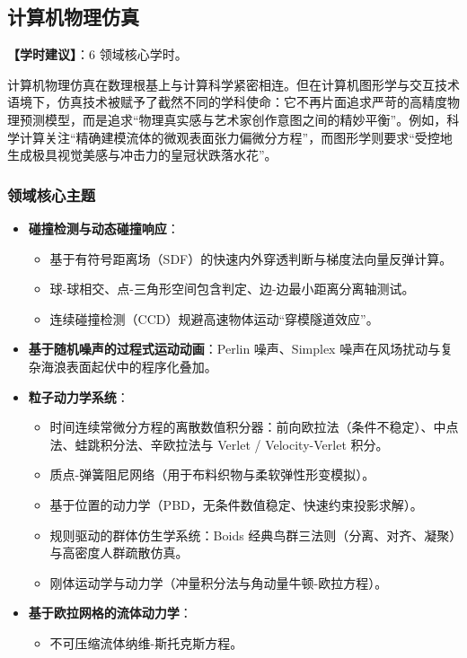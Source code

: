 \subsection{计算机物理仿真}
\textbf{【学时建议】}：6 领域核心学时。

计算机物理仿真在数理根基上与计算科学紧密相连。但在计算机图形学与交互技术语境下，仿真技术被赋予了截然不同的学科使命：它不再片面追求严苛的高精度物理预测模型，而是追求“物理真实感与艺术家创作意图之间的精妙平衡”。例如，科学计算关注“精确建模流体的微观表面张力偏微分方程”，而图形学则要求“受控地生成极具视觉美感与冲击力的皇冠状跌落水花”。

\subsubsection{领域核心主题}
\begin{itemize}
    \item \textbf{碰撞检测与动态碰撞响应}：
    \begin{itemize}
        \item 基于有符号距离场（SDF）的快速内外穿透判断与梯度法向量反弹计算。
        \item 球-球相交、点-三角形空间包含判定、边-边最小距离分离轴测试。
        \item 连续碰撞检测（CCD）规避高速物体运动“穿模隧道效应”。
    \end{itemize}
    \item \textbf{基于随机噪声的过程式运动动画}：Perlin 噪声、Simplex 噪声在风场扰动与复杂海浪表面起伏中的程序化叠加。
    \item \textbf{粒子动力学系统}：
    \begin{itemize}
        \item 时间连续常微分方程的离散数值积分器：前向欧拉法（条件不稳定）、中点法、蛙跳积分法、辛欧拉法与 Verlet / Velocity-Verlet 积分。
        \item 质点-弹簧阻尼网络（用于布料织物与柔软弹性形变模拟）。
        \item 基于位置的动力学（PBD，无条件数值稳定、快速约束投影求解）。
        \item 规则驱动的群体仿生学系统：Boids 经典鸟群三法则（分离、对齐、凝聚）与高密度人群疏散仿真。
        \item 刚体运动学与动力学（冲量积分法与角动量牛顿-欧拉方程）。
    \end{itemize}
    \item \textbf{基于欧拉网格的流体动力学}：
    \begin{itemize}
        \item 不可压缩流体纳维-斯托克斯方程。

\end{itemize}
\end{itemize}
